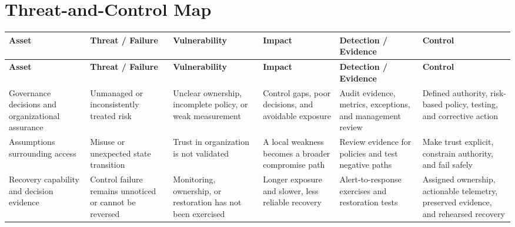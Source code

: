 \documentclass[11pt]{article}
\begin{document}
\section*{Threat-and-Control Map}
\begingroup\scriptsize\setlength{\tabcolsep}{2pt}
\begin{longtable}{>{\RaggedRight\arraybackslash}p{}>{\RaggedRight\arraybackslash}p{}>{\RaggedRight\arraybackslash}p{}>{\RaggedRight\arraybackslash}p{}>{\RaggedRight\arraybackslash}p{}>{\RaggedRight\arraybackslash}p{}}
\toprule\rowcolor{Navy}\color{white}\textbf{Asset} & \color{white}\textbf{Threat / Failure} & \color{white}\textbf{Vulnerability} & \color{white}\textbf{Impact} & \color{white}\textbf{Detection / Evidence} & \color{white}\textbf{Control}\\\midrule
\endfirsthead
\toprule\rowcolor{Navy}\color{white}\textbf{Asset} & \color{white}\textbf{Threat / Failure} & \color{white}\textbf{Vulnerability} & \color{white}\textbf{Impact} & \color{white}\textbf{Detection / Evidence} & \color{white}\textbf{Control}\\\midrule
\endhead
Governance decisions and organizational assurance & Unmanaged or inconsistently treated risk & Unclear ownership, incomplete policy, or weak measurement & Control gaps, poor decisions, and avoidable exposure & Audit evidence, metrics, exceptions, and management review & Defined authority, risk-based policy, testing, and corrective action\\\midrule
Assumptions surrounding access & Misuse or unexpected state transition & Trust in organization is not validated & A local weakness becomes a broader compromise path & Review evidence for policies and test negative paths & Make trust explicit, constrain authority, and fail safely\\\midrule
Recovery capability and decision evidence & Control failure remains unnoticed or cannot be reversed & Monitoring, ownership, or restoration has not been exercised & Longer exposure and slower, less reliable recovery & Alert-to-response exercises and restoration tests & Assigned ownership, actionable telemetry, preserved evidence, and rehearsed recovery\\\midrule
\bottomrule
\end{longtable}
\endgroup
\end{document}
